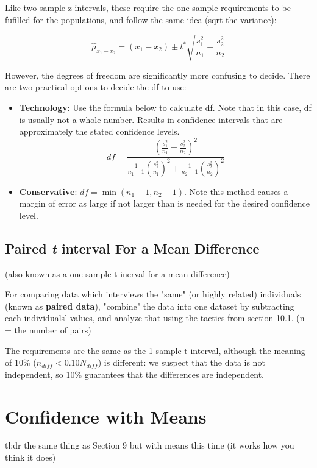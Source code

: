 \documentclass[12pt, a4paper]{article}
\theoremstyle{definition}
\begin{document}
Like two-sample z intervals, these require the one-sample requirements to be fufilled for the populations, and follow the same idea (sqrt the variance):

\[\hat{\mu}_{x_1 - x_2} = (\bar{x_1} - \bar{x_2}) \pm t^{*}\sqrt{\frac{s_1^2}{n_1}+\frac{s_2^2}{n_2}}\]

However, the degrees of freedom are significantly more confusing to decide. There are two practical options to decide the df to use:
\begin{itemize}
    \item \textbf{Technology}: Use the formula below to calculate df. Note that in this case, df is usually not a whole number.
    Results in confidence intervals that are approximately the stated confidence levels.
    \[df = \frac{{(\frac{s_1^2}{n_1} + \frac{s_2^2}{n_2})}^2}{\frac{1}{n_1 - 1} {(\frac{s_1^2}{n_1})}^2 + \frac{1}{n_2 - 1} {(\frac{s_2^2}{n_2})}^2}\] %

    \item \textbf{Conservative}: $df = \min{(n_1 - 1, n_2 - 1)}$.
    Note this method causes a margin of error as large if not larger than is needed for the desired confidence level.
\end{itemize}

\subsection{Paired \textit{t} interval For a Mean Difference}
(also known as a one-sample t inerval for a mean difference)

For comparing data which interviews the "same" (or highly related) individuals (known as \textbf{paired data}), "combine" the data into one dataset by subtracting each individuals' values, and analyze that using the tactics from section 10.1.
(n = the number of pairs)

The requirements are the same as the 1-sample t interval, although the meaning of 10\% ($n_{diff} < 0.10N_{diff}$) is different: we suspect that the data is not independent, so 10\% guarantees that the differences are independent.





\newpage

\section{Confidence with Means}
tl;dr the same thing as Section 9 but with means this time (it works how you think it does)
\end{document}
